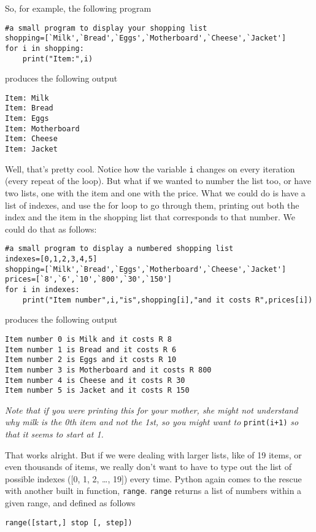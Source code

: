 So, for example, the following program
\begin{lstlisting}
#a small program to display your shopping list
shopping=[`Milk',`Bread',`Eggs',`Motherboard',`Cheese',`Jacket']
for i in shopping:
    print("Item:",i)
\end{lstlisting}

produces the following output
\begin{lstlisting}
Item: Milk
Item: Bread
Item: Eggs
Item: Motherboard
Item: Cheese
Item: Jacket
\end{lstlisting}

Well, that's pretty cool. Notice how the variable \texttt{i} changes on every iteration (every repeat of the loop). But what if we wanted to number the list too, or have two lists, one with the item and one with the price. What we could do is have a list of indexes, and use the for loop to go through them, printing out both the index and the item in the shopping list that corresponds to that number. We could do that as follows: 
\begin{lstlisting}
#a small program to display a numbered shopping list
indexes=[0,1,2,3,4,5]
shopping=[`Milk',`Bread',`Eggs',`Motherboard',`Cheese',`Jacket']
prices=[`8',`6',`10',`800',`30',`150']
for i in indexes:
    print("Item number",i,"is",shopping[i],"and it costs R",prices[i])
\end{lstlisting}   produces the following output  
\lstset{keywordstyle=\ttfamily}
\begin{lstlisting}
Item number 0 is Milk and it costs R 8
Item number 1 is Bread and it costs R 6
Item number 2 is Eggs and it costs R 10
Item number 3 is Motherboard and it costs R 800
Item number 4 is Cheese and it costs R 30
Item number 5 is Jacket and it costs R 150
\end{lstlisting}
\lstset{keywordstyle=\textbf}
\textit{Note that if you were printing this for your mother, she might not understand why milk is the 0th item and not the 1st, so you might want to} \texttt{print(i+1)} \textit{so that it seems to start at 1.}

 That works alright. But if we were dealing with larger lists,   like of 19 items, or even thousands of items, we really don't   want to have to type out the list of possible indexes ([0, 1, 2, \ldots, 19]) every time. Python again comes to the rescue with another built in   function, \texttt{range}.   \texttt{range} returns a list of numbers within a given range, and defined as   follows
\begin{lstlisting}
range([start,] stop [, step])
\end{lstlisting}

